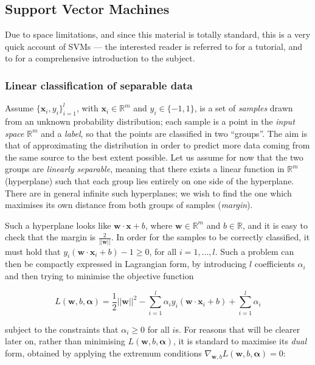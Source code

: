 \documentclass[conference]{IEEEtran}
\def\RR{\mathbb{R}}
\def\xx{\mathbf{x}}
\def\ww{\mathbf{w}}
\def\aa{\boldsymbol{\alpha}}
\begin{document}
\subsection{Support Vector Machines}
\label{subs:svm}

Due to space limitations, and since this material is totally standard,
this is a very quick account of SVMs --- the interested reader is
referred to \cite{Burges98,SmolaTut2004} for a tutorial, and to
\cite{Cristianini00} for a comprehensive introduction to the subject.

\subsubsection{Linear classification of separable data}

Assume $\{\xx_i,y_i\}_{i=1}^l$, with $\xx_i \in \RR^m$ and $y_i \in
\{-1,1\}$, is a set of \emph{samples} drawn from an unknown
probability distribution; each sample is a point in the \emph{input
space} $\RR^m$ and a \emph{label}, so that the points are classified
in two ``groups''. The aim is that of approximating the distribution
in order to predict more data coming from the same source to the best
extent possible. Let us assume for now that the two groups are
\emph{linearly separable}, meaning that there exists a linear function
in $\RR^m$ (hyperplane) such that each group lies entirely on one side
of the hyperplane. There are in general infinite such hyperplanes; we
wish to find the one which maximises its own distance from both groups
of samples (\emph{margin}).

Such a hyperplane looks like $\ww\cdot\xx + b$, where $\ww \in \RR^m$
and $b \in \RR$, and it is easy to check that the margin is
$\frac{2}{||\ww||}$. In order for the samples to be correctly
classified, it must hold that $y_i(\ww\cdot\xx_i + b)-1\geq 0$, for
all $i=1,\ldots,l$. Such a problem can then be compactly expressed in
Lagrangian form, by introducing $l$ coefficients $\alpha_i$ and then
trying to minimise the objective function

$$ L(\ww,b,\aa) = \frac{1}{2}||\ww||^2 -
                  \sum_{i=1}^{l} \alpha_i y_i(\ww\cdot\xx_i + b) +
                  \sum_{i=1}^{l} \alpha_i $$

\noindent subject to the constraints that $\alpha_i\geq 0$ for all
$i$s. For reasons that will be clearer later on, rather than
minimising $L(\ww,b,\aa)$, it is standard to maximise its \emph{dual}
form, obtained by applying the extremum conditions $\nabla_{\ww,b}
L(\ww,b,\aa) = 0$:
\end{document}
